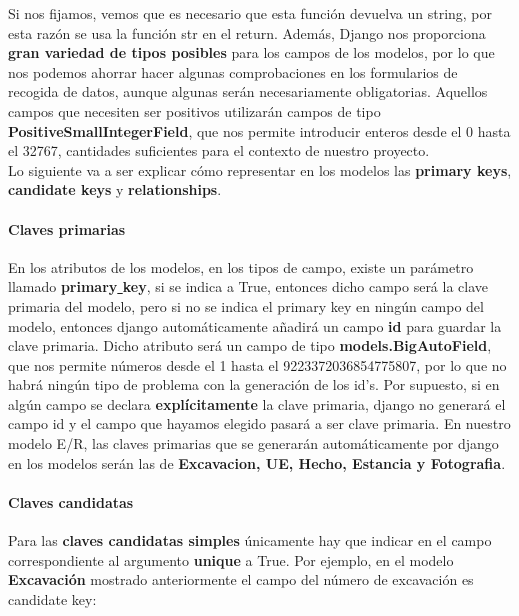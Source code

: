     Si nos fijamos, vemos que es necesario que esta función devuelva un string, por esta
    razón se usa la función str en el return. Además, Django nos proporciona \textbf{gran
    variedad de tipos posibles} para los campos de los modelos, por lo que nos podemos
    ahorrar hacer algunas comprobaciones en los formularios de recogida de datos, aunque
    algunas serán necesariamente obligatorias. Aquellos campos que necesiten ser positivos
    utilizarán campos de tipo \textbf{PositiveSmallIntegerField}, que nos permite introducir
    enteros desde el 0 hasta el 32767, cantidades suficientes para el contexto de nuestro
    proyecto.\\

    Lo siguiente va a ser explicar cómo representar en los modelos las \textbf{primary keys},
    \textbf{candidate keys} y \textbf{relationships}.\\
    
    \paragraph{Claves primarias} \underline{}
    \newline En los atributos de los modelos, en los tipos de campo, existe un parámetro llamado
    \textbf{primary\underline{ }key}, si se indica a True, entonces dicho campo será la clave
    primaria del modelo, pero si no se indica el primary key en ningún campo del modelo,
    entonces django automáticamente añadirá un campo \textbf{id} para guardar la clave primaria.
    Dicho atributo será un campo de tipo \textbf{models.BigAutoField}, que nos permite números
    desde el 1 hasta el 9223372036854775807, por lo que no habrá ningún tipo de problema con
    la generación de los id's. Por supuesto, si en algún campo se declara \textbf{explícitamente}
    la clave primaria, django no generará el campo id y el campo que hayamos elegido pasará a
    ser clave primaria. En nuestro modelo E/R, las claves primarias que se generarán
    automáticamente por django en los modelos serán las de \textbf{Excavacion, UE, Hecho,
    Estancia y Fotografia}. 
    
    \paragraph{Claves candidatas} \underline{}
    \newline Para las \textbf{claves candidatas simples} únicamente hay que indicar en el campo
    correspondiente al argumento \textbf{unique} a True. Por ejemplo, en el modelo
    \textbf{Excavación} mostrado anteriormente el campo del número de excavación es
    candidate key:
    
